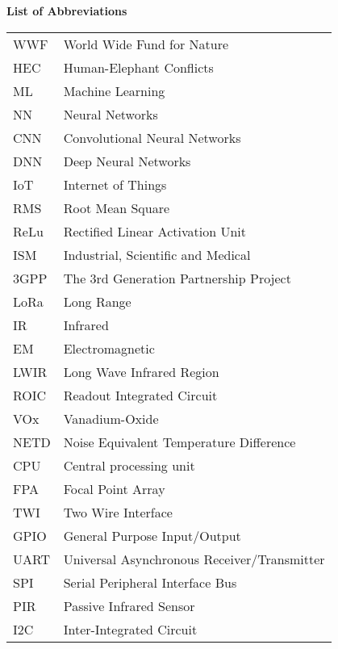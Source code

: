 \begin{poglavje}
\noindent\bfseries List of Abbreviations
\end{poglavje}
\bigskip
\bigskip
\bigskip
\bigskip
\bigskip

\begingroup
\renewcommand\arraystretch{1.3}
\begin{flushleft}
    \begin{longtable}[l]{p{2.5cm}l}
        WWF     & World Wide Fund for Nature\\
        HEC     & Human-Elephant Conflicts\\
        ML      & Machine Learning\\
        NN      & Neural Networks\\
        CNN     & Convolutional Neural Networks\\
        DNN     & Deep Neural Networks\\
        IoT     & Internet of Things\\
        RMS     & Root Mean Square\\
        ReLu    & Rectified Linear Activation Unit\\
        ISM     & Industrial, Scientific and Medical\\
        3GPP    & The 3rd Generation Partnership Project\\
        LoRa    & Long Range\\
        IR      & Infrared\\
        EM      & Electromagnetic\\
        LWIR    & Long Wave Infrared Region\\
        ROIC    & Readout Integrated Circuit\\
        VOx     & Vanadium-Oxide\\
        NETD    & Noise Equivalent Temperature Difference\\
        CPU     & Central processing unit\\
        FPA     & Focal Point Array\\
        TWI     & Two Wire Interface\\
        GPIO    & General Purpose Input/Output\\
        UART    & Universal Asynchronous Receiver/Transmitter\\
        SPI     & Serial Peripheral Interface Bus\\
        PIR     & Passive Infrared Sensor\\
        I2C     & Inter-Integrated Circuit\\

\end{longtable}
\end{flushleft}
